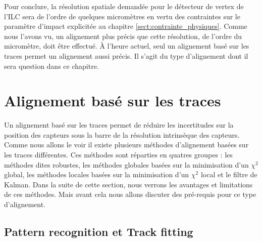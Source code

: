    Pour conclure, la r\'esolution spatiale demand\'ee pour le d\'etecteur de vertex de l'ILC sera de l'ordre de quelques microm\`etres en vertu des contraintes sur le param\`etre d'impact explicit\'ee au chapitre \ref{sect:contrainte_physiques}. Comme nous l'avons vu, un alignement plus pr\'ecis que cette r\'esolution, de l'ordre du microm\`etre, doit être effectu\'e. \`A l'heure actuel, seul un alignement bas\'e sur les traces permet un alignement aussi pr\'ecis. Il s'agit du type d'alignement dont il sera question dans ce chapitre. \\
   
   \section{Alignement bas\'e sur les traces}
   \label{sect:alignTraces}
  
   Un alignement bas\'e sur les traces permet de r\'eduire les incertitudes sur la position des capteurs sous la barre de la r\'esolution intrins\`eque des capteurs. Comme nous allons le voir il existe plusieurs m\'ethodes d'alignement bas\'ees sur les traces diff\'erentes. Ces m\'ethodes sont r\'eparties en quatres groupes : les m\'ethodes dites robustes, les m\'ethodes globales bas\'ees sur la minimisation d'un $\chi^2$ global, les m\'ethodes locales bas\'ees sur la minimisation d'un $\chi^2$ local et le filtre de Kalman. Dans la suite de cette section, nous verrons les avantages et limitations de ces m\'ethodes. Mais avant cela nous allons discuter des pr\'e-requis pour ce type d'alignement.
 
%  

 
   \subsection{Pattern recognition et Track fitting}
   
